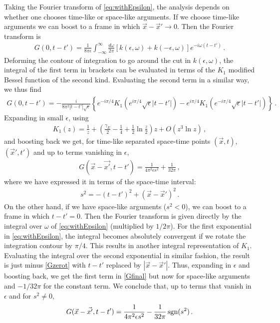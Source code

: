 \documentclass[aps,preprintnumbers,superscriptaddress,longbibliography]{revtex4-1}
\begin{document}
Taking the Fourier transform of \eqref{eq:withEpsilon}, the analysis depends on whether one chooses time-like or space-like arguments. If we choose time-like arguments we can boost to a frame in which $\vec{x}-\vec{x}'\to0$. Then the Fourier transform is 
\begin{align}
    G(0,t-t') = \frac1{8\pi\epsilon}\int^\infty_{-\infty}\frac{d\omega}{2\pi}\left[ k(\epsilon,\omega)+k(-\epsilon,\omega)\right] e^{-i\omega (t-t')}\,.
\end{align}
Deforming the contour of integration to go around the cut in $k(\epsilon,\omega)$, the integral of the first term in brackets can be evaluated in terms of the $K_1$ modified Bessel function of the second kind. Evaluating the second term in a similar way, we thus find
\begin{align}
\label{Gzerot}
    G(0,t-t') = -\frac{i}{8\pi^2|t-t'|\sqrt{\epsilon}} \left\{ e^{-i\pi/4}K_1\left(e^{i\pi/4}\sqrt{\epsilon}|t-t'|\right) - e^{i\pi/4}K_1\left(e^{-i\pi/4}\sqrt{\epsilon}|t-t'|\right)\right\}\,.
\end{align}
Expanding in small $\epsilon$, using
\begin{align}
\label{KoneSeries}
    K_1(z) = \frac1z +\left(\frac{\gamma_E}{2}-\frac14+\frac12\ln\frac{z}2\right)z + O(z^3\ln z)\,,
\end{align}
and boosting back we get, for time-like separated space-time points $(\vec{x},t)$, $(\vec{x}',t')$ and up to terms vanishing in $\epsilon$,
\begin{align}
\label{Gfinal}
    G(\vec{x}-\vec{x'},t-t') = \frac1{4\pi^2\epsilon s^2}+\frac1{32\pi}\,,
\end{align}
where we have expressed it in terms of the space-time interval:
\begin{align}
    s^2 = -(t-t')^2+(\vec{x}-\vec{x}')^2\,.
\end{align}
On the other hand, if we have space-like arguments ($s^2<0$), we can boost to a frame in which $t-t'=0$. Then the Fourier transform is given directly by the integral over $\omega$ of   \eqref{eq:withEpsilon} (multiplied by $1/2\pi$). For the first exponential in \eqref{eq:withEpsilon}, the integral becomes absolutely convergent if we rotate the integration contour by $\pi/4$. This results in another integral representation of $K_1$. Evaluating the integral over the second exponential in similar fashion, the result is just minus \eqref{Gzerot} with $t-t'$ replaced by $|\vec{x}-\vec{x}'|$. Thus, expanding in $\epsilon$ and boosting back, we get the first term in \eqref{Gfinal} but now for space-like arguments and $-1/32\pi$ for the constant term. We conclude that, up to terms that vanish in $\epsilon$ and for $s^2\ne0$,
\begin{align}
    G(\vec{x}-\vec{x'},t-t') = \frac1{4\pi^2\epsilon s^2} -\frac1{32\pi}\operatorname{sgn}(s^2)\,.
\end{align}
\end{document}
